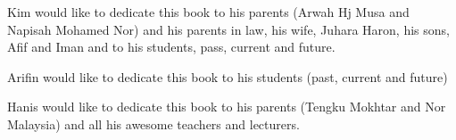 
\thispagestyle{empty}

\begin{center}

Kim would like to dedicate this book to his parents (Arwah Hj Musa and Napisah Mohamed Nor) and his parents in law, his wife, Juhara Haron, his sons, Afif and Iman and to his students, pass, current and future.

Arifin would like to dedicate this book to his students (past, current and future)

Hanis would like to dedicate this book to his parents (Tengku Mokhtar and Nor Malaysia) and all his awesome teachers and lecturers.


\end{center}

\setlength{\abovedisplayskip}{-5pt}
\setlength{\abovedisplayshortskip}{-5pt}

